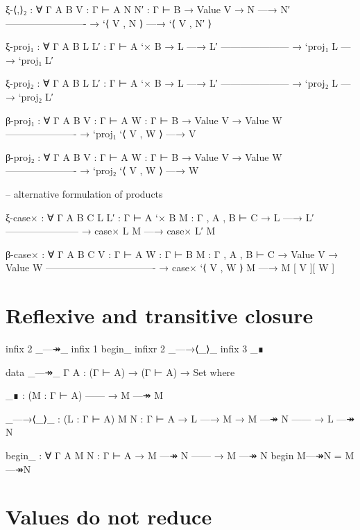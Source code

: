 \begin{fence}
\begin{code}
  ξ-⟨,⟩₂ : ∀ {Γ A B} {V : Γ ⊢ A} {N N′ : Γ ⊢ B}
    → Value V
    → N —→ N′
      -------------------------
    → `⟨ V , N ⟩ —→ `⟨ V , N′ ⟩

  ξ-proj₁ : ∀ {Γ A B} {L L′ : Γ ⊢ A `× B}
    → L —→ L′
      ---------------------
    → `proj₁ L —→ `proj₁ L′

  ξ-proj₂ : ∀ {Γ A B} {L L′ : Γ ⊢ A `× B}
    → L —→ L′
      ---------------------
    → `proj₂ L —→ `proj₂ L′

  β-proj₁ : ∀ {Γ A B} {V : Γ ⊢ A} {W : Γ ⊢ B}
    → Value V
    → Value W
      ----------------------
    → `proj₁ `⟨ V , W ⟩ —→ V

  β-proj₂ : ∀ {Γ A B} {V : Γ ⊢ A} {W : Γ ⊢ B}
    → Value V
    → Value W
      ----------------------
    → `proj₂ `⟨ V , W ⟩ —→ W

  -- alternative formulation of products

  ξ-case× : ∀ {Γ A B C} {L L′ : Γ ⊢ A `× B} {M : Γ , A , B ⊢ C}
    → L —→ L′
      -----------------------
    → case× L M —→ case× L′ M

  β-case× : ∀ {Γ A B C} {V : Γ ⊢ A} {W : Γ ⊢ B} {M : Γ , A , B ⊢ C}
    → Value V
    → Value W
      ----------------------------------
    → case× `⟨ V , W ⟩ M —→ M [ V ][ W ]

\end{code}
\end{fence}

\hypertarget{reflexive-and-transitive-closure}{%
\section{Reflexive and transitive
closure}\label{reflexive-and-transitive-closure}}

\begin{fence}
\begin{code}
infix  2 _—↠_
infix  1 begin_
infixr 2 _—→⟨_⟩_
infix  3 _∎

data _—↠_ {Γ A} : (Γ ⊢ A) → (Γ ⊢ A) → Set where

  _∎ : (M : Γ ⊢ A)
      ------
    → M —↠ M

  _—→⟨_⟩_ : (L : Γ ⊢ A) {M N : Γ ⊢ A}
    → L —→ M
    → M —↠ N
      ------
    → L —↠ N

begin_ : ∀ {Γ A} {M N : Γ ⊢ A}
  → M —↠ N
    ------
  → M —↠ N
begin M—↠N = M—↠N
\end{code}
\end{fence}

\hypertarget{values-do-not-reduce}{%
\section{Values do not reduce}\label{values-do-not-reduce}}

